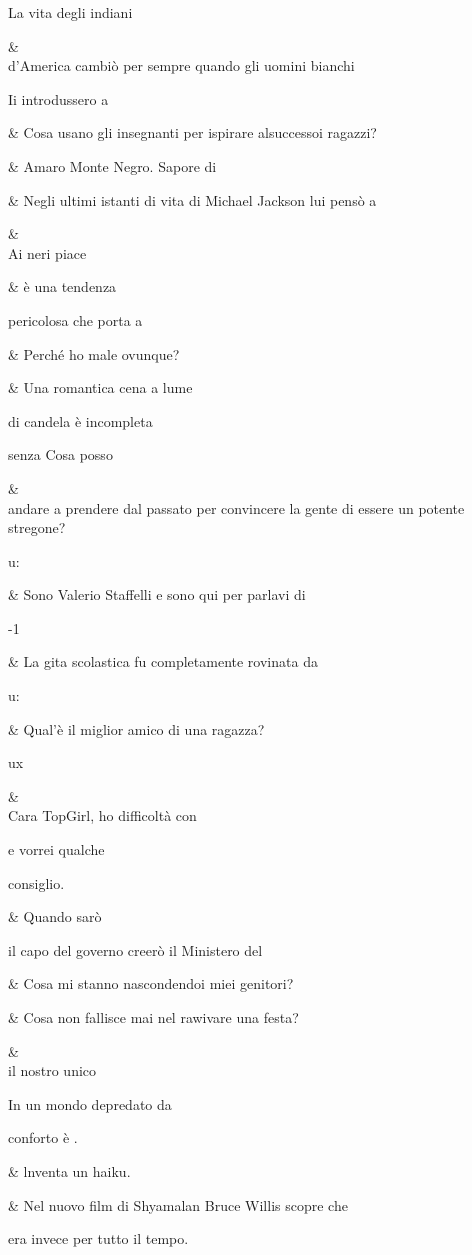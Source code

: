 La vita degli indiani

&
\\
d’America cambiò
per sempre quando
gli uomini bianchi

Ii introdussero a

&
Cosa usano
gli insegnanti
per ispirare
alsuccessoi
ragazzi?

&
Amaro Monte
Negro. Sapore di

&
Negli ultimi
istanti di vita di
Michael Jackson
lui pensò a

&
\\
Ai neri piace

&
è una tendenza

pericolosa
che porta a

&
Perché ho male
ovunque?

&
Una romantica
cena a lume

di candela è
incompleta

senza
Cosa posso

&
\\
andare a prendere
dal passato per
convincere la
gente di essere un
potente stregone?

u:

&
Sono Valerio
Staffelli e sono
qui per parlavi di

-1

&
La gita
scolastica fu
completamente
rovinata da

u:

&
Qual’è il miglior
amico di una
ragazza?

ux

&
\\
Cara TopGirl,
ho difficoltà con

e vorrei qualche

consiglio.

&
Quando sarò

il capo del
governo creerò
il Ministero del

&
Cosa mi stanno
nascondendoi
miei genitori?

&
Cosa non fallisce
mai nel rawivare
una festa?

&
\\
il nostro unico

In un mondo
depredato da

conforto è .

&
lnventa un haiku.

&
Nel nuovo film di
Shyamalan Bruce
Willis scopre che

era invece
per tutto il tempo.

